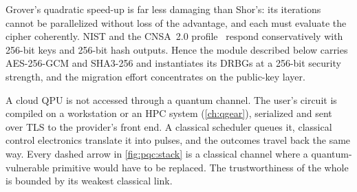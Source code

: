 Grover's quadratic speed-up is far less damaging than Shor's: its iterations cannot be parallelized without loss of the advantage, and each must evaluate the cipher coherently. NIST and the CNSA~2.0 profile~\cite{nsa2022cnsa2} respond conservatively with 256-bit keys and 256-bit hash outputs. Hence the module described below carries AES-256-GCM and SHA3-256 and instantiates its DRBGs at a 256-bit security strength, and the migration effort concentrates on the public-key layer.

A cloud QPU is not accessed through a quantum channel. The user's circuit is compiled on a workstation or an HPC system (\cref{ch:qgear}), serialized and sent over TLS to the provider's front end. A classical scheduler queues it, classical control electronics translate it into pulses, and the outcomes travel back the same way. Every dashed arrow in \cref{fig:pqc:stack} is a classical channel where a quantum-vulnerable primitive would have to be replaced. The trustworthiness of the whole is bounded by its weakest classical link.

